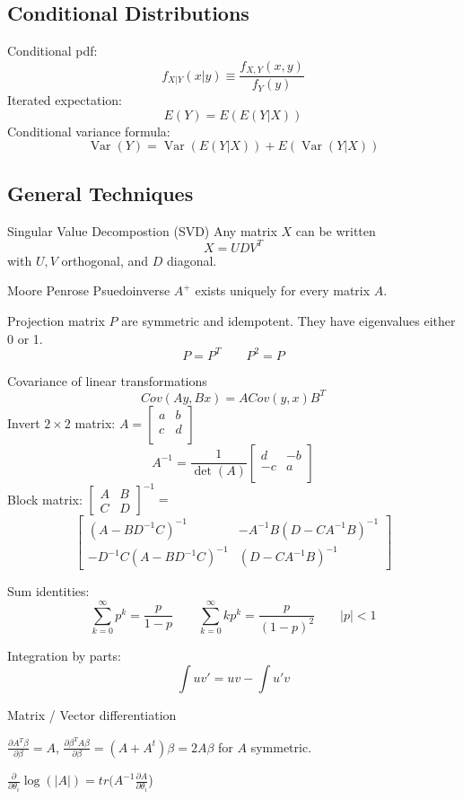 \documentclass[10pt, twocolumn]{article}
\newcommand{\Var}{\operatorname{Var}}
\begin{document}
\subsection*{Conditional Distributions}

Conditional pdf:
\[
    f_{X|Y}(x | y) \equiv \frac{f_{X, Y}(x, y)}{f_Y(y)}
\]
Iterated expectation:
\[
    E(Y) = E(E(Y | X))
\]
Conditional variance formula:
\[
    \Var(Y) = \Var(E(Y | X)) + E(\Var(Y | X))
\]

\newpage

\subsection*{General Techniques}

Singular Value Decompostion (SVD) Any matrix $X$ can be written
\[
    X = UDV^T
\]
with $U, V$ orthogonal, and $D$ diagonal.

Moore Penrose Psuedoinverse $A^+$ exists uniquely for every matrix $A$.

Projection matrix $P$ are symmetric and idempotent. They have eigenvalues
either 0 or 1.
\[
    P = P^T \qquad P^2 = P
\]

Covariance of linear transformations
\[
    Cov(Ay, Bx) = A Cov(y, x) B^T
\]
Invert $2 \times 2$ matrix:
$
    A = 
    [\begin{smallmatrix}
        a & b \\
        c & d \\
    \end{smallmatrix}]
$
\[
    A^{-1} = 
    \frac{1}{\det (A)}
    \begin{bmatrix}
        d & -b \\
        -c & a \\
    \end{bmatrix}
\]
Block matrix:
$
\begin{bmatrix}
    A & B \\
    C & D
\end{bmatrix}^{-1} =
$
\[
\begin{bmatrix}
                     (A - BD^{-1}C)^{-1}         & -A^{-1}B(D -
    CA^{-1}B)^{-1} \\
                     -D^{-1}C(A - BD^{-1}C)^{-1} & (D - CA^{-1}B)^{-1}  
\end{bmatrix}
\]

Sum identities:
\[
    \sum_{k=0}^{\infty} p^k = \frac{p}{1 - p} \qquad 
    \sum_{k=0}^{\infty} k p^k = \frac{p}{(1 - p)^2} \qquad |p| < 1
\]

Integration by parts:
\[
    \int uv' = uv - \int u'v
\]

Matrix / Vector differentiation

$\frac{\partial A^T \beta}{\partial \beta} = A$, 
$\frac{\partial \beta^T A \beta}{\partial \beta} = (A + A^t) \beta =
2A\beta$ for $A$ symmetric.

$\frac{\partial}{\partial \theta_i} \log (|A|) =
tr( A^{-1} \frac{\partial A}{\partial \theta_i}$)

\newpage
\end{document}
